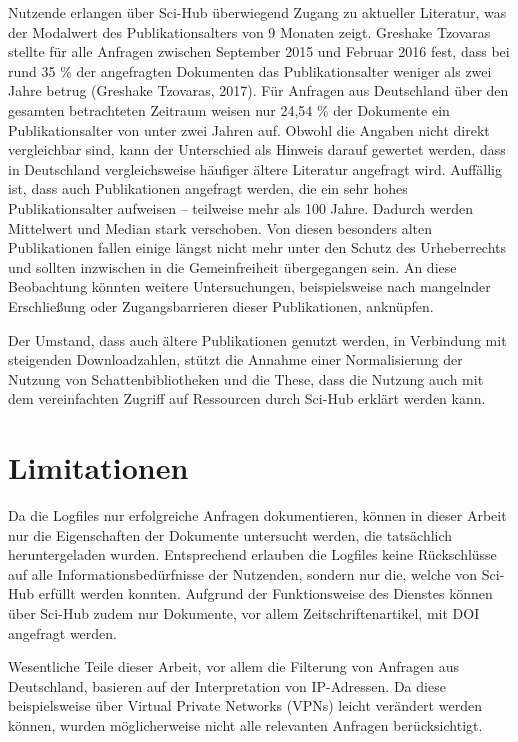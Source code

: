 \documentclass[a4paper,
fontsize=11pt,
oneside,
numbers=noperiodatend,
parskip=half-,
bibliography=totoc,
final
]{scrartcl}
\begin{document}
Nutzende erlangen über Sci-Hub überwiegend Zugang zu aktueller
Literatur, was der Modalwert des Publikationsalters von 9 Monaten zeigt.
Greshake Tzovaras stellte für alle Anfragen zwischen September 2015 und
Februar 2016 fest, dass bei rund 35 \% der angefragten Dokumenten das
Publikationsalter weniger als zwei Jahre betrug (Greshake Tzovaras,
2017). Für Anfragen aus Deutschland über den gesamten betrachteten
Zeitraum weisen nur 24,54 \% der Dokumente ein Publikationsalter von
unter zwei Jahren auf. Obwohl die Angaben nicht direkt vergleichbar
sind, kann der Unterschied als Hinweis darauf gewertet werden, dass in
Deutschland vergleichsweise häufiger ältere Literatur angefragt wird.
Auffällig ist, dass auch Publikationen angefragt werden, die ein sehr
hohes Publikationsalter aufweisen -- teilweise mehr als 100 Jahre.
Dadurch werden Mittelwert und Median stark verschoben. Von diesen
besonders alten Publikationen fallen einige längst nicht mehr unter den
Schutz des Urheberrechts und sollten inzwischen in die Gemeinfreiheit
übergegangen sein. An diese Beobachtung könnten weitere Untersuchungen,
beispielsweise nach mangelnder Erschließung oder Zugangsbarrieren dieser
Publikationen, anknüpfen.

Der Umstand, dass auch ältere Publikationen genutzt werden, in
Verbindung mit steigenden Downloadzahlen, stützt die Annahme einer
Normalisierung der Nutzung von Schattenbibliotheken und die These, dass
die Nutzung auch mit dem vereinfachten Zugriff auf Ressourcen durch
Sci-Hub erklärt werden kann.

\hypertarget{limitationen}{%
\section{Limitationen}\label{limitationen}}

Da die Logfiles nur erfolgreiche Anfragen dokumentieren, können in
dieser Arbeit nur die Eigenschaften der Dokumente untersucht werden, die
tatsächlich heruntergeladen wurden. Entsprechend erlauben die Logfiles
keine Rückschlüsse auf alle Informationsbedürfnisse der Nutzenden,
sondern nur die, welche von Sci-Hub erfüllt werden konnten. Aufgrund der
Funktionsweise des Dienstes können über Sci-Hub zudem nur Dokumente, vor
allem Zeitschriftenartikel, mit DOI angefragt werden.

Wesentliche Teile dieser Arbeit, vor allem die Filterung von Anfragen
aus Deutschland, basieren auf der Interpretation von IP-Adressen. Da
diese beispielsweise über Virtual Private Networks (VPNs) leicht
verändert werden können, wurden möglicherweise nicht alle relevanten
Anfragen berücksichtigt.
\end{document}
